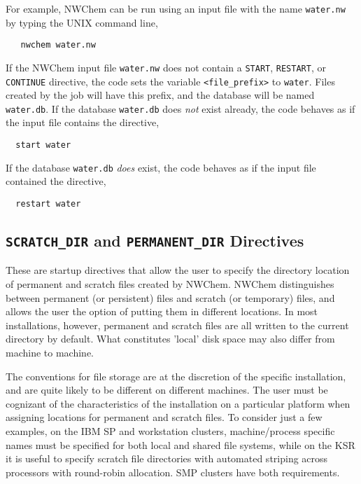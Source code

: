 For example, NWChem can be run using an input file with the name 
\verb+water.nw+ 
by typing the UNIX command line,

\begin{verbatim}
   nwchem water.nw
\end{verbatim}

If the NWChem input file \verb+water.nw+ does not contain
a \verb+START+, \verb+RESTART+, or \verb+CONTINUE+ directive, the code
sets the variable {\tt <file\_prefix>} to {\tt water}.  Files created
by the job will have this prefix, and the database will be named
{\tt water.db}.  If the database \verb+water.db+ does {\it not} exist already,
the code behaves as if the input file contains the directive,

\begin{verbatim}
  start water
\end{verbatim}

If the database \verb+water.db+ {\it does} exist,
the code behaves as if the input file contained the directive,

\begin{verbatim}
  restart water
\end{verbatim}


\subsection{{\tt SCRATCH\_DIR} and {\tt PERMANENT\_DIR} Directives}
\label{sec:dirs}


These are startup directives that allow the user to specify the
directory location of permanent and scratch files created by NWChem.
NWChem distinguishes between permanent (or persistent) files and
scratch (or temporary) files, and allows the user the option of
putting them in different locations.  In most installations, however,
permanent and scratch files are all written to the current directory
by default.  What constitutes 'local' disk space may also differ from 
machine to machine.

The conventions for file storage are at the discretion of the specific 
installation, and are quite likely to be different on different machines.  
The user must be cognizant of the characteristics of the installation
on a particular platform when assigning locations for permanent and
scratch files.  To consider just a few examples, on the IBM SP 
and workstation clusters, machine/process
specific names must be specified for both local and shared file
systems, while on the KSR it is useful to specify scratch file directories
with automated striping across processors with round-robin allocation.
SMP clusters have both requirements.  

